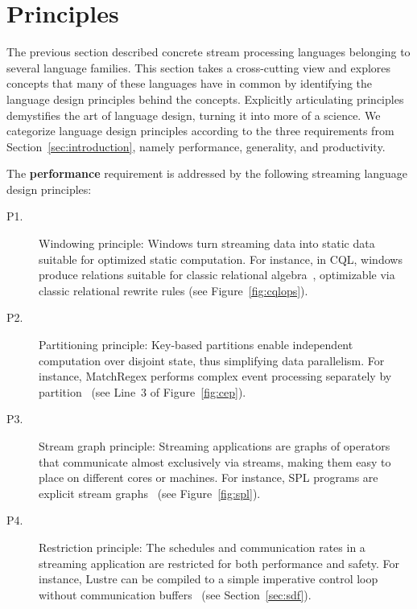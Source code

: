 \section{Principles}\label{sec:principles}

The previous section described concrete stream processing languages
belonging to several language families. This section takes a
cross-cutting view and explores concepts that many of these languages
have in common by identifying the language design principles behind
the concepts.  Explicitly articulating principles demystifies the art
of language design, turning it into more of a science. We categorize
language design principles according to the three requirements from
Section~\ref{sec:introduction}, namely performance, generality, and
productivity.

The \textbf{performance} requirement is addressed by the following streaming
language design principles:
\begin{description}
  \item[P1.] Windowing principle: Windows turn streaming data into
    static data suitable for optimized static computation.  For
    instance, in CQL, windows produce relations suitable for classic
    relational algebra~\cite{arasu_babu_widom_2006}, optimizable via
    classic relational rewrite rules (see Figure~\ref{fig:cqlops}).
  \item[P2.] Partitioning principle: Key-based partitions enable
    independent computation over disjoint state, thus simplifying data
    parallelism. For instance, MatchRegex performs complex event
    processing separately by partition~\cite{hirzel_2012} (see Line~3
    of Figure~\ref{fig:cep}).
  \item[P3.] Stream graph principle: Streaming applications are graphs of
    operators that communicate almost exclusively via streams, making
    them easy to place on different cores or machines. For instance,
    SPL programs are explicit stream
    graphs~\cite{hirzel_schneider_gedik_2017} (see
    Figure~\ref{fig:spl}).
  \item[P4.] Restriction principle: The schedules and communication
    rates in a streaming application are restricted for both
    performance and safety. For instance, Lustre can be compiled to a
    simple imperative control loop without communication
    buffers~\cite{lustre_1987} (see Section~\ref{sec:sdf}).
\end{description}

